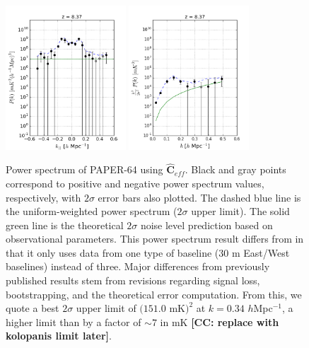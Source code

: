 \documentclass[preprint2,numberedappendix,tighten]{aastex6}  %
\newcommand{\cc}[1]{{\color{purple} \textbf{[CC: #1]}}}
\begin{document}
\begin{figure}
	\centering
	\includegraphics[width=0.4\textwidth]{plots/ps1_data_add.png}
	\includegraphics[width=0.4\textwidth]{plots/ps2_data_add.png}
	\caption{Power spectrum of PAPER-64 using $\widehat{\textbf{C}}_{eff}$. Black and gray points correspond to positive and 
negative power spectrum values, respectively, with $2\sigma$ error bars also plotted. The dashed blue line is the uniform-weighted 
power spectrum ($2\sigma$ upper limit). The solid green line is the theoretical $2\sigma$ noise level prediction based on 
observational parameters. This power spectrum result differs from  in that it only uses data from one type of baseline ($30$ m 
East/West baselines) instead of three. Major differences from previously published results stem from revisions regarding signal 
loss, bootstrapping, and the theoretical error computation. From this, we quote a best $2\sigma$ upper limit of $(151.0$ mK$)^{2}$ at 
$k=0.34$ $h$Mpc$^{-1}$, a higher limit than  by a factor of $\sim7$ in mK \cc{replace with kolopanis limit later}.}
	\label{fig:ps1_data}
\end{figure}
\end{document}
